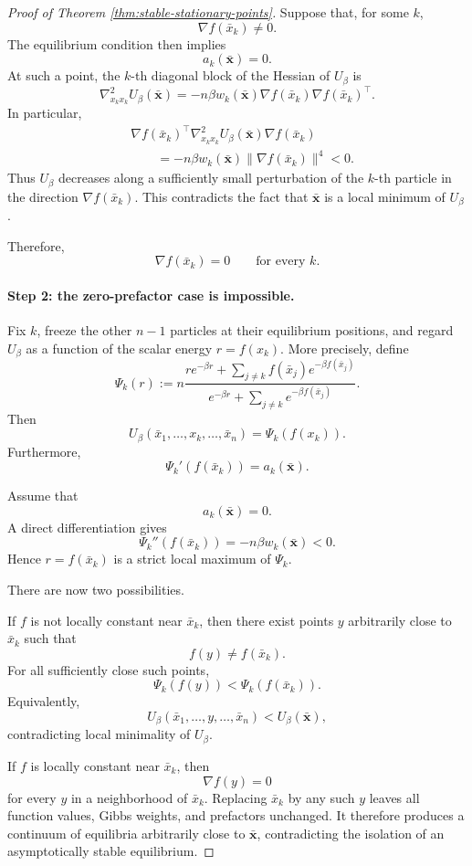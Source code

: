 \documentclass{article}
\theoremstyle{plain}
\theoremstyle{definition}
\theoremstyle{remark}
\begin{document}
\begin{proof}[Proof of Theorem \ref{thm:stable-stationary-points}]
Suppose that, for some \(k\),
\[
    \nabla f(\bar x_k)\neq0.
\]
The equilibrium condition then implies
\[
    a_k(\bar{\mathbf x})=0.
\]
At such a point, the \(k\)-th diagonal block of the Hessian of \(U_\beta\) is
\[
    \nabla^2_{x_kx_k}U_\beta(\bar{\mathbf x}) = -n\beta w_k(\bar{\mathbf x}) \nabla f(\bar x_k)\nabla f(\bar x_k)^\top.
\]
In particular,
\[
    \begin{aligned}
        &\nabla f(\bar x_k)^\top \nabla^2_{x_kx_k}U_\beta(\bar{\mathbf x}) \nabla f(\bar x_k) \\
        &\qquad = -n\beta w_k(\bar{\mathbf x}) \|\nabla f(\bar x_k)\|^4 <0.
    \end{aligned}
\]
Thus \(U_\beta\) decreases along a sufficiently small perturbation of the \(k\)-th particle in the direction \(\nabla f(\bar x_k)\). This contradicts the fact that \(\bar{\mathbf x}\) is a local minimum of \(U_\beta\).

Therefore,
\[
    \nabla f(\bar x_k)=0 \qquad \text{for every }k.
\]

\paragraph{Step 2: the zero-prefactor case is impossible.}

Fix \(k\), freeze the other \(n-1\) particles at their equilibrium positions, and regard \(U_\beta\) as a function of the scalar energy \(r=f(x_k)\). More precisely, define
\[
    \Psi_k(r) := n \frac{r e^{-\beta r} + \sum_{j\neq k} f(\bar x_j)e^{-\beta f(\bar x_j)}}{e^{-\beta r} + \sum_{j\neq k} e^{-\beta f(\bar x_j)}}.
\]
Then
\[
    U_\beta (\bar x_1,\ldots,x_k,\ldots,\bar x_n) = \Psi_k(f(x_k)).
\]
Furthermore,
\[
    \Psi_k'(f(\bar x_k)) = a_k(\bar{\mathbf x}).
\]

Assume that
\[
    a_k(\bar{\mathbf x})=0.
\]
A direct differentiation gives
\[
    \Psi_k''(f(\bar x_k)) = -n\beta w_k(\bar{\mathbf x})<0.
\]
Hence \(r=f(\bar x_k)\) is a strict local maximum of \(\Psi_k\).

There are now two possibilities.

If \(f\) is not locally constant near \(\bar x_k\), then there exist points \(y\) arbitrarily close to \(\bar x_k\) such that
\[
    f(y)\neq f(\bar x_k).
\]
For all sufficiently close such points,
\[
    \Psi_k(f(y)) < \Psi_k(f(\bar x_k)).
\]
Equivalently,
\[
    U_\beta(\bar x_1,\ldots,y,\ldots,\bar x_n) < U_\beta(\bar{\mathbf x}),
\]
contradicting local minimality of \(U_\beta\).

If \(f\) is locally constant near \(\bar x_k\), then
\[
    \nabla f(y)=0
\]
for every \(y\) in a neighborhood of \(\bar x_k\). Replacing \(\bar x_k\) by any such \(y\) leaves all function values, Gibbs weights, and prefactors unchanged. It therefore produces a continuum of equilibria arbitrarily close to \(\bar{\mathbf x}\), contradicting the isolation of an asymptotically stable equilibrium.


\end{proof}
\end{document}

